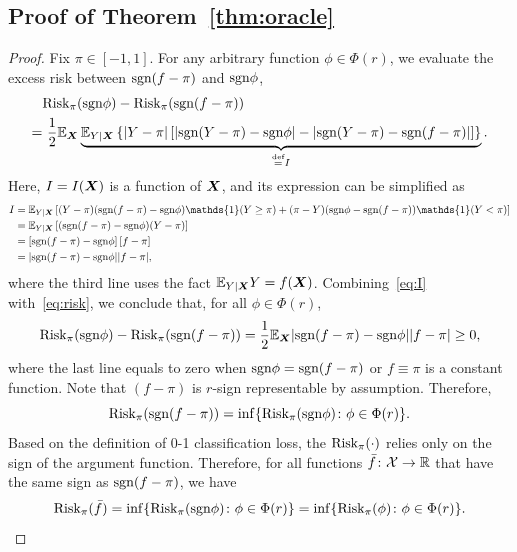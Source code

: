 \documentclass[11pt]{article}
\newcommand*{\KeepStyleUnderBrace}[1]{%
\mathop{%
\mathchoice
{\underbrace{\displaystyle#1}}%
{\underbrace{\textstyle#1}}%
{\underbrace{\scriptstyle#1}}%
{\underbrace{\scriptscriptstyle#1}}%
}\limits
}
\theoremstyle{plain}
\theoremstyle{definition}
\def\sign{\textup{sgn}}
\def\risk{\textup{Risk}_\pi}
\begin{document}
\subsection{Proof of Theorem~\ref{thm:oracle}}
\begin{proof}
Fix $\pi\in[-1,1]$. For any arbitrary function $\phi\in \Phi(r)$, we evaluate the excess risk between $\sign(f-\pi)$ and $\sign \phi$,
\begin{align}\label{eq:risk}
&\risk(\sign \phi)- \risk(\sign(f-\pi)) \notag \\
= &\ {1\over 2}\mathbb{E}_{\mX}\KeepStyleUnderBrace{\mathbb{E}_{Y|\mX}\left\{|Y-\pi|\left[\left|\sign(Y-\pi)-\sign\phi \right|-\left|\sign(Y-\pi)-\sign(f-\pi)\right|\right]\right\}}_{\stackrel{\text{def}}{=}I}.
\end{align}
Here, $I=I(\bm X)$ is a function of $\bm X$, and its expression can be simplified as
\begin{align}\label{eq:I}
I&= \mathbb{E}_{Y|\mX}\left[ (Y-\pi)(\sign(f-\pi) - \sign \phi)\mathds{1}(Y\geq \pi)+(\pi-Y)(\sign\phi -\sign (f-\pi))\mathds{1}(Y< \pi)\right]\notag \\
&= \mathbb{E}_{Y|\mX}\left[(\sign(f-\pi)-\sign \phi) (Y-\pi)\right]\notag \\
&= \left[\sign(f-\pi)-\sign\phi \right]\left[f-\pi\right]\notag \\
&= |\sign(f-\pi)-\sign \phi ||f-\pi|,
\end{align}
where the third line uses the fact $\mathbb{E}_{Y|\bm X}Y=f(\bm X)$. Combining~\eqref{eq:I} with~\eqref{eq:risk}, we conclude that, for all $\phi\in\Phi(r)$, 
\begin{equation}\label{eq:minimum}
\risk(\sign \phi)- \risk(\sign(f-\pi)) ={1\over 2} \mathbb{E}_{\mX} |\sign(f-\pi)-\sign \phi ||f-\pi|\geq 0,
\end{equation}
where the last line equals to zero when $\sign \phi=\sign(f-\pi)$ or $f\equiv \pi$ is a constant function. Note that $(f-\pi)$ is $r$-sign representable by assumption. Therefore, 
\[
\risk(\sign(f-\pi))=\inf\{\risk(\sign \phi )\colon \phi\in \Phi(r)\}. 
\]
Based on the definition of 0-1 classification loss, the $\risk(\cdot)$ relies only on the sign of the argument function. Therefore, for all functions $\bar f \colon \mathcal{X}\to\mathbb{R}$ that have the same sign as $\sign(f-\pi)$, we have
\[
\risk(\bar f)=\inf\{\risk(\sign \phi )\colon \phi\in \Phi(r)\}=\inf\{\risk( \phi )\colon \phi\in \Phi(r)\}.
\]
\end{proof}
\end{document}
